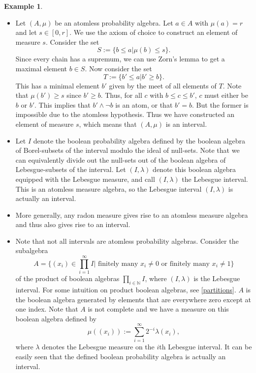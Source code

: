\documentclass[a4paper]{amsproc}
\theoremstyle{plain}
\theoremstyle{definition}
\newtheorem{example}[theorem]{Example}
\theoremstyle{remark}
\numberwithin{equation}{section}
\begin{document}
\begin{example} \label{interval_examples}
\begin{itemize}
\item Let $(A,\mu)$ be an atomless probability algebra. Let $a \in A$ with $\mu(a) = r$ and let $s \in [0,r]$. We use the axiom of choice to construct an element of measure $s$. Consider the set
\[
S := \{ b \leq a | \mu(b) \leq s \}.
\]
Since every chain has a supremum, we can use Zorn's lemma to get a maximal element $b \in S$. Now consider the set
\[
T := \{ b' \leq a | b' \geq b\} .
\]
This has a minimal element $b'$ given by the meet of all elements of $T$. Note that $\mu(b') \geq s$ since $b' \geq b$. Thus, for all $c$ with $b \leq c \leq b'$, $c$ must either be $b$ or $b'$. This implies that $b' \wedge \neg b$ is an atom, or that $b' = b$. But the former is impossible due to the atomless hypothesis. Thus we have constructed an element of measure $s$, which means that $(A,\mu)$ is an interval.
\item Let $I$ denote the boolean probability algebra defined by the boolean algebra of Borel-subsets of the interval modulo the ideal of null-sets. Note that we can equivalently divide out the null-sets out of the boolean algebra of Lebesgue-subsets of the interval. Let $(I, \lambda)$ denote this boolean algebra equipped with the Lebesgue measure, and call $(I, \lambda)$ the Lebesgue interval. This is an atomless measure algebra, so the Lebesgue interval $(I, \lambda)$ is actually an interval.
\item More generally, any radon measure gives rise to an atomless measure algebra and thus also gives rise to an interval.
\item Note that not all intervals are atomless probability algebras. Consider the subalgebra
\[
A = \{(x_i) \in \prod_{i=1}^{\infty} I | \text{ finitely many } x_i \neq 0 \text{ or finitely many } x_i \neq 1 \}
\]
of the product of boolean algebras $\prod_{i \in \mathbb{N}} I$, where $(I, \lambda)$ is the Lebesgue interval. For some intuition on product boolean algebras, see \ref{partitions}. $A$ is the boolean algebra generated by elements that are everywhere zero except at one index. Note that $A$ is not complete and we have a measure on this boolean algebra defined by
\[
\mu((x_i)) := \sum_{i=1}^{\infty} 2^{-i} \lambda(x_i) ,
\]
where $\lambda$ denotes the Lebesgue measure on the $i$th Lebesgue interval. It can be easily seen that the defined boolean probability algebra is actually an interval.
\end{itemize}
\end{example}
\end{document}
